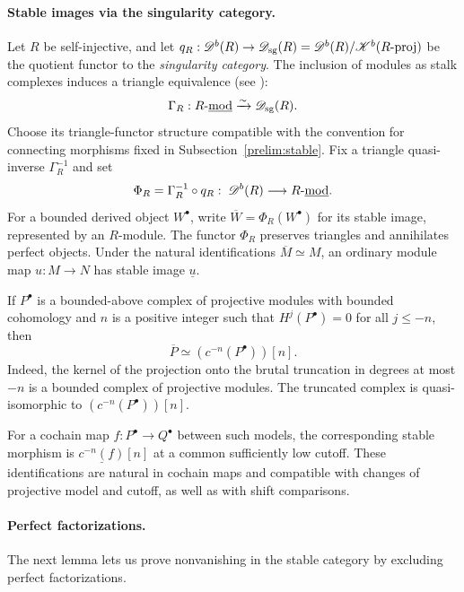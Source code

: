 \documentclass[11pt]{article}
\begin{document}
\paragraph{Stable images via the singularity category.}
Let $R$ be self-injective, and let
$q_R:\mathscr D^b(R)\to\mathscr D_{\rm sg}(R)
=\mathscr D^b(R)/\mathscr K^b(R\text{-}\mathrm{proj})$
be the quotient functor to the \emph{singularity category}.
The inclusion of modules as stalk complexes induces a triangle equivalence
(see \cite[Theorem~6.2.5]{KrauseHTR}):
\[
 \Gamma_R:R\text{-}\underline{\mathrm{mod}}
 \xrightarrow{\sim}\mathscr D_{\rm sg}(R).
\]
Choose its triangle-functor structure compatible with the convention for
connecting morphisms fixed in Subsection~\ref{prelim:stable}.
Fix a triangle quasi-inverse $\Gamma_R^{-1}$ and set
\[
 \Phi_R=\Gamma_R^{-1}\circ q_R:\;
 \mathscr D^b(R)\longrightarrow R\text{-}\underline{\mathrm{mod}}.
\]
For a bounded derived object $W^\bullet$, write
$\overline W=\Phi_R(W^\bullet)$ for its stable image, represented by an
$R$-module. The functor $\Phi_R$ preserves triangles and annihilates
perfect objects. Under the natural identifications $\overline M\simeq M$,
an ordinary module map $u:M\to N$ has stable image $\underline u$.

If $P^\bullet$ is a bounded-above complex of projective modules with
bounded cohomology and $n$ is a positive integer such that
$H^j(P^\bullet)=0$ for all $j\le-n$, then
\[
 \overline P\simeq(c^{-n}(P^\bullet))[n].
\]
Indeed, the kernel of the projection onto the brutal truncation in degrees
at most $-n$ is a bounded complex of projective modules. The truncated
complex is quasi-isomorphic to $(c^{-n}(P^\bullet))[n]$.

For a cochain map $f:P^\bullet\to Q^\bullet$ between such models,
the corresponding stable morphism is $\underline{c^{-n}(f)}[n]$
at a common sufficiently low cutoff. These identifications are natural
in cochain maps and compatible with changes of projective model and
cutoff, as well as with shift comparisons.

\paragraph{Perfect factorizations.}

The next lemma lets us prove nonvanishing in the stable category by
excluding perfect factorizations.
\end{document}
